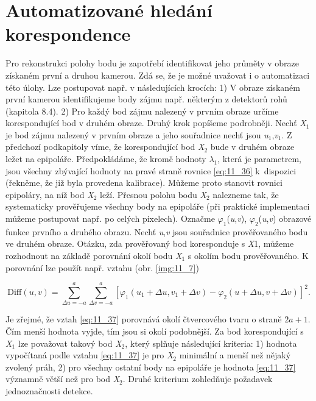 \section*{Automatizované hledání korespondence}

Pro rekonstrukci polohy bodu je zapotřebí identifikovat jeho průměty v obraze získaném první a druhou kamerou. Zdá se, že je možné uvažovat i o automatizaci této úlohy. Lze postupovat např. v následujících krocích: 1) V obraze získaném první kamerou identifikujeme body zájmu např. některým z detektorů rohů (kapitola 8.4). 2) Pro každý bod zájmu nalezený v prvním obraze určíme korespondující bod v druhém obraze. Druhý krok popíšeme podrobněji. Nechť \textit{X}$_1$ je bod zájmu nalezený v prvním obraze a jeho souřadnice nechť jsou \textit{u}$_1$,\textit{v}$_1$. Z předchozí podkapitoly víme, že korespondující bod \textit{X}$_2$ bude v druhém obraze ležet na epipoláře. Předpokládáme, že kromě hodnoty $\lambda_1$, která je parametrem, jsou všechny zbývající hodnoty na pravé straně rovnice \eqref{eq:11_36} k~dispozici (řekněme, že již byla provedena kalibrace). Můžeme proto stanovit rovnici epipoláry, na níž bod \textit{X}$_2$ leží. Přesnou polohu bodu \textit{X}$_2$ nalezneme tak, že systematicky prověřujeme všechny body na epipoláře (při praktické implementaci můžeme postupovat např. po celých pixelech). Označme $\varphi_1$(\textit{u},\textit{v}), $\varphi_2$(\textit{u},\textit{v}) obrazové funkce prvního a druhého obrazu. Nechť \textit{u},\textit{v} jsou souřadnice prověřovaného bodu ve druhém obraze. Otázku, zda prověřovaný bod koresponduje s \textit{X}1, můžeme rozhodnout na základě porovnání okolí bodu \textit{X}$_1$ s okolím bodu prověřovaného. K porovnání lze použít např. vztahu (obr. \ref{img:11_7})

\begin{equation} \label{eq:11_37}
    \mathrm{Diff} \left( u,v \right) = \sum_{\Delta u=-a}^{a} \sum_{\Delta v=-a}^{a} \left[ \varphi_1 \left( u_1 + \Delta u,v_1 + \Delta v \right) - \varphi_2 \left( u + \Delta u, v + \Delta v \right) \right]^2.
\end{equation}

Je zřejmé, že vztah \eqref{eq:11_37} porovnává okolí čtvercového tvaru o straně $2 a + 1$. Čím menší hodnota vyjde, tím jsou si okolí podobnější. Za bod korespondující s \textit{X}$_1$ lze považovat takový bod \textit{X}$_2$, který splňuje následující kriteria: 1) hodnota vypočítaná podle vztahu \eqref{eq:11_37} je pro \textit{X}$_2$ minimální a menší než nějaký zvolený práh, 2) pro všechny ostatní body na epipoláře je hodnota \eqref{eq:11_37} významně větší než pro bod \textit{X}$_2$. Druhé kriterium zohledňuje požadavek jednoznačnosti detekce.

